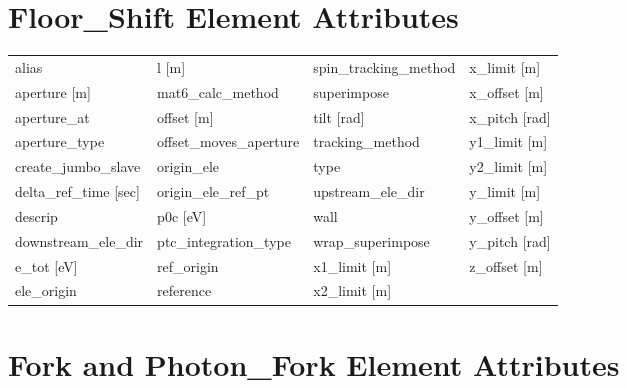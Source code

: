  \section{Floor_Shift Element Attributes}
 \label{s:list.floor.shift}
 
 \begin{tabular}{llll} \toprule
alias                            & l [m]                            & spin_tracking_method             & x_limit [m]                      \\
aperture [m]                     & mat6_calc_method                 & superimpose                      & x_offset [m]                     \\
aperture_at                      & offset [m]                       & tilt [rad]                       & x_pitch [rad]                    \\
aperture_type                    & offset_moves_aperture            & tracking_method                  & y1_limit [m]                     \\
create_jumbo_slave               & origin_ele                       & type                             & y2_limit [m]                     \\
delta_ref_time [sec]             & origin_ele_ref_pt                & upstream_ele_dir                 & y_limit [m]                      \\
descrip                          & p0c [eV]                         & wall                             & y_offset [m]                     \\
downstream_ele_dir               & ptc_integration_type             & wrap_superimpose                 & y_pitch [rad]                    \\
e_tot [eV]                       & ref_origin                       & x1_limit [m]                     & z_offset [m]                     \\
ele_origin                       & reference                        & x2_limit [m]                     &                                  \\
 \bottomrule
 \end{tabular}
 \vfill
 
 \section{Fork and Photon_Fork Element Attributes}
 \label{s:list.fork}
 
